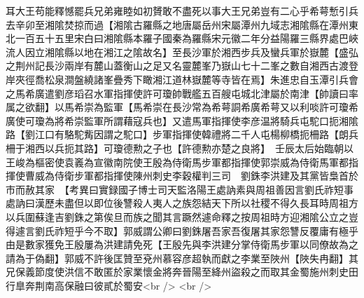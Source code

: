 耳大王苟能釋憾罷兵兄弟雍睦如初贇敢不盡死以事大王兄弟豈有二心乎希萼慙引兵去辛卯至湘隂焚掠而過【湘隂古羅縣之地唐屬岳州宋屬潭州九域志湘隂縣在潭州東北一百五十五里宋白曰湘隂縣本羅子國秦為羅縣宋元徽二年分益陽羅三縣界處巴峽流人因立湘隂縣以地在湘江之隂故名】至長沙軍於湘西步兵及蠻兵軍於嶽麓【盛弘之荆州記長沙兩岸有麓山蓋衡山之足又名靈麓峯乃嶽山七十二峯之數自湘西古渡登岸夾徑喬松泉澗盤繞諸峯疊秀下瞰湘江道林嶽麓等寺皆在焉】朱進忠自玉潭引兵會之馬希廣遣劉彦瑫召水軍指揮使許可瓊帥戰艦五百艘屯城北津屬於南津【帥讀曰率属之欲翻】以馬希崇為監軍【馬希崇在長沙常為希萼詷希廣希萼又以利啖許可瓊希廣使可瓊為將希崇監軍所謂藉寇兵也】又遣馬軍指揮使李彦温將騎兵屯駝口扼湘隂路【劉江口有駱駝觜因謂之駝口】步軍指揮使韓禮將二千人屯楊柳橋扼柵路【朗兵柵于湘西以兵扼其路】可瓊德勲之子也【許德勲亦楚之良將】　壬辰太后始臨朝以王峻為樞密使袁㠖為宣徽南院使王殷為侍衛馬步軍都指揮使郭崇威為侍衛馬軍都指揮使曹威為侍衛步軍都指揮使陳州刺史李穀權判三司　劉銖李洪建及其黨皆梟首於市而赦其家　【考異曰實録國子博士司天監洛陽王處訥素與周祖善因言劉氏祚短事處訥曰漢歷未盡但以即位後讐殺人夷人之族怨結天下所以社稷不得久長耳時周祖方以兵圍蘇逢吉劉銖之第俟旦而族之聞其言蹶然遽命釋之按周祖時方迎湘隂公立之豈得遽言劉氏祚短乎今不取】郭威謂公卿曰劉銖屠吾家吾復屠其家怨讐反覆庸有極乎由是數家獲免王殷屢為洪建請免死【王殷先與李洪建分掌侍衛馬步軍以同僚故為之請為于偽翻】郭威不許後匡贊至兗州慕容彦超執而獻之李業至陜州【陜失冉翻】其兄保義節度使洪信不敢匿於家業懷金將奔晉陽至絳州盜殺之而取其金蜀施州刺史田行臯奔荆南高保融曰彼貳於蜀安<br />
<br />
